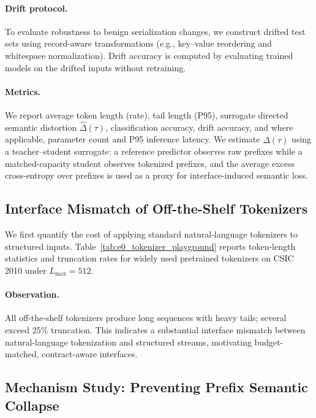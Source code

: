 \paragraph{Drift protocol.}
To evaluate robustness to benign serialization changes, we construct drifted test sets using record-aware transformations (e.g., key--value reordering and whitespace normalization).
Drift accuracy is computed by evaluating trained models on the drifted inputs without retraining.

\paragraph{Metrics.}
We report average token length (rate), tail length (P95), surrogate directed semantic distortion $\widehat{\Delta}(\tau)$, classification accuracy, drift accuracy, and where applicable, parameter count and P95 inference latency.
We estimate $\widehat{\Delta}(\tau)$ using a teacher--student surrogate: a reference predictor observes raw prefixes while a matched-capacity student observes tokenized prefixes, and the average excess cross-entropy over prefixes is used as a proxy for interface-induced semantic loss.

\subsection{Interface Mismatch of Off-the-Shelf Tokenizers}
\label{sec:exp_off_the_shelf}

We first quantify the cost of applying standard natural-language tokenizers to structured inputs.
Table~\ref{tab:e0_tokenizer_playground} reports token-length statistics and truncation rates for widely used pretrained tokenizers on CSIC 2010 under $L_{\max}=512$.

\paragraph{Observation.}
All off-the-shelf tokenizers produce long sequences with heavy tails; several exceed 25\% truncation.
This indicates a substantial interface mismatch between natural-language tokenization and structured streams, motivating budget-matched, contract-aware interfaces.



\subsection{Mechanism Study: Preventing Prefix Semantic Collapse}
\label{sec:exp_mechanism}

